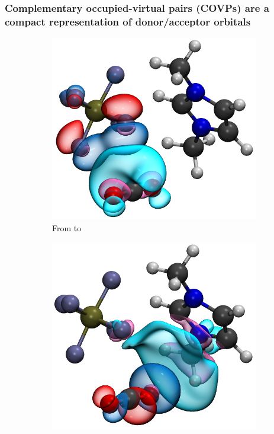 \documentclass[%
    xcolor=usenames,dvipsnames,svgnames%
]{beamer}
\begin{document}
\begin{frame}
  \frametitle{Complementary occupied-virtual pairs (COVPs) are a compact representation of donor/acceptor orbitals}
  \begin{figure}
    \centering
    \begin{subfigure}[b]{0.50\linewidth}
      \includegraphics[width=\linewidth,keepaspectratio,natwidth=601,natheight=535]{./figures/PF6.to_CO2.1.png}
      \caption*{From \ce{[PF6]-} to }
    \end{subfigure}%
    \begin{subfigure}[b]{0.50\linewidth}
      \includegraphics[width=\linewidth,keepaspectratio,natwidth=586,natheight=538]{./figures/PF6.from_CO2.1.png}

\end{subfigure}
\end{figure}
\end{frame}
\end{document}

